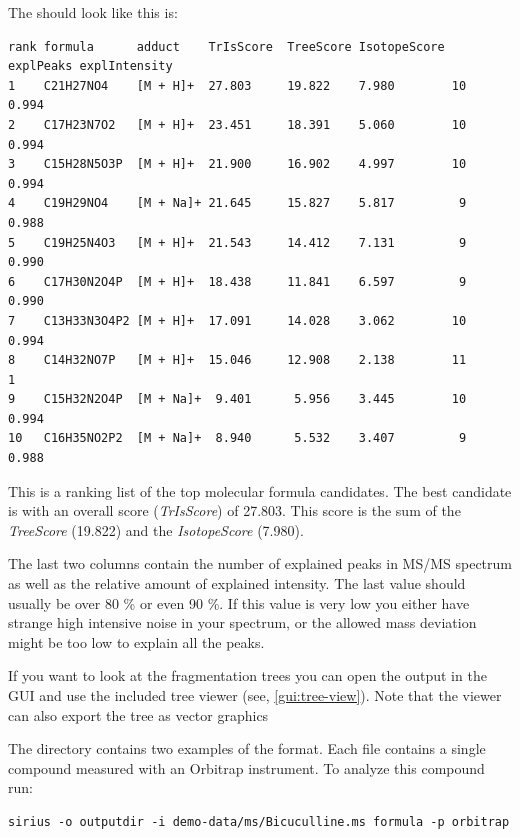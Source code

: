 \documentclass[letterpaper,10pt,openany,oneside]{sphinxmanual}
\newcommand\gui[1]{\textsl{\guilsinglleft#1\guilsinglright\xspace}}
\begin{document}
The  should look like this is:
%

\begin{Verbatim}[commandchars=\\\{\}]
rank formula      adduct    TrIsScore  TreeScore IsotopeScore explPeaks explIntensity
1    C21H27NO4    [M + H]+  27.803     19.822    7.980        10        0.994
2    C17H23N7O2   [M + H]+  23.451     18.391    5.060        10        0.994
3    C15H28N5O3P  [M + H]+  21.900     16.902    4.997        10        0.994
4    C19H29NO4    [M + Na]+ 21.645     15.827    5.817         9        0.988
5    C19H25N4O3   [M + H]+  21.543     14.412    7.131         9        0.990
6    C17H30N2O4P  [M + H]+  18.438     11.841    6.597         9        0.990
7    C13H33N3O4P2 [M + H]+  17.091     14.028    3.062        10        0.994
8    C14H32NO7P   [M + H]+  15.046     12.908    2.138        11        1
9    C15H32N2O4P  [M + Na]+  9.401      5.956    3.445        10        0.994
10   C16H35NO2P2  [M + Na]+  8.940      5.532    3.407         9        0.988

\end{Verbatim}

This is a ranking list of the top molecular formula candidates. The best
candidate is  with an overall score (\gui{TrIsScore}) of 27.803. This score is the
sum of the \gui{TreeScore} (19.822) and the \gui{IsotopeScore} (7.980). 

The last two columns contain the number of explained peaks in MS/MS spectrum
as well as the relative amount of explained intensity. The last value should
usually be over 80 \% or even 90 \%. If this value is very low you either
have strange high intensive noise in your spectrum, or the allowed mass
deviation might be too low to explain all the peaks.

If you want to look at the fragmentation trees you can open the output  in the GUI and use
the included tree viewer (see, \ref{gui:tree-view}). Note that the viewer can also export the tree as vector graphics    

The directory  contains two examples of the  format. Each file contains a single compound measured with an Orbitrap instrument. To analyze this compound run:

\begin{Verbatim}[commandchars=\\\{\}]
sirius -o outputdir -i demo-data/ms/Bicuculline.ms formula -p orbitrap
\end{Verbatim}
\end{document}
